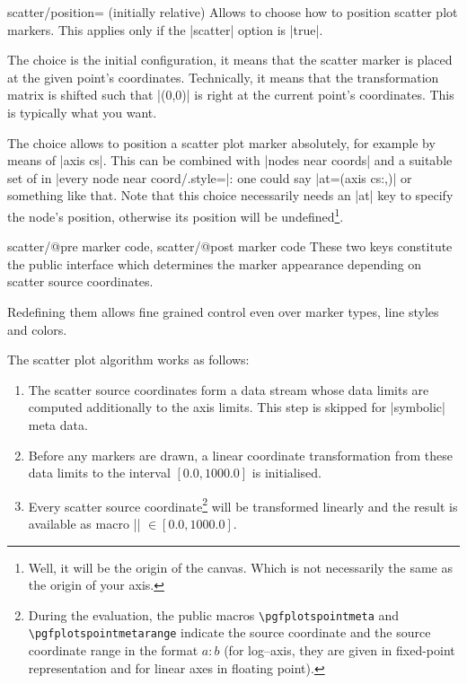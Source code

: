 {\begin{pgfplotskey}{scatter/position= (initially relative)}
	Allows to choose how to position scatter plot markers. This applies only if the |scatter| option is |true|.

	The choice  is the initial configuration, it means that the scatter marker is placed at the given point's coordinates. Technically, it means that the transformation matrix is shifted such that |(0,0)| is right at the current point's coordinates. This is typically what you want.

	The choice  allows to position a scatter plot marker absolutely, for example by means of |axis cs|. This can be combined with |nodes near coords| and a suitable set of  in |every node near coord/.style=|: one could say |at={(axis cs:\coordindex,)}| or something like that. Note that this choice necessarily needs an |at| key to specify the node's position, otherwise its position will be undefined\footnote{Well, it will be the origin of the canvas. Which is not necessarily the same as the origin of your axis.}. 
	
\end{pgfplotskey}

\begin{pgfplotsxycodekeylist}{
	scatter/@pre marker code,
	scatter/@post marker code}
	These two keys constitute the public interface which determines the marker appearance depending on scatter source coordinates.

	Redefining them allows fine grained control even over marker types, line styles and colors.

	The scatter plot algorithm works as follows:
\begin{enumerate} 
\item The scatter source coordinates form a data stream whose data limits are computed additionally to the axis limits. This step is skipped for |symbolic| meta data.
\item Before any markers are drawn, a linear coordinate transformation from these data limits to the interval $[0.0,1000.0]$ is initialised. 
\item Every scatter source coordinate\footnote{During the evaluation, the public macros \texttt{\textbackslash pgfplotspointmeta} and \texttt{\textbackslash pgfplotspointmetarange} indicate the source coordinate and the source coordinate range in the format $a:b$ (for log--axis, they are given in fixed-point representation and for linear axes in floating point).} will be transformed linearly and the result is available as macro |\pgfplotspointmetatransformed| $ \in [0.0,1000.0]$.


\end{enumerate}
\end{pgfplotsxycodekeylist}}
